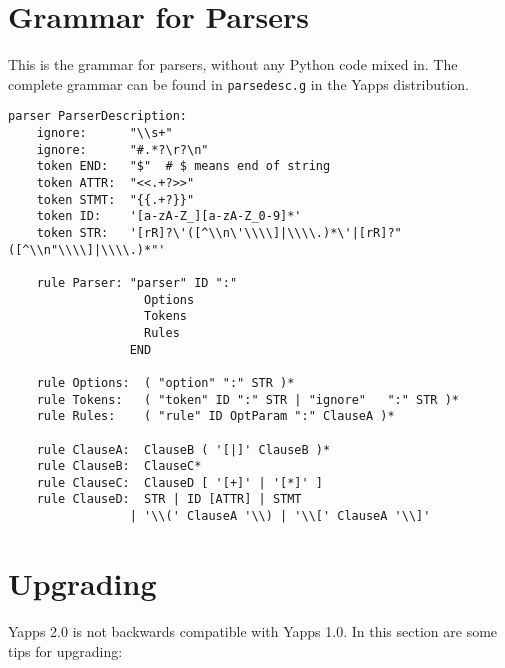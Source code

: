 \documentclass[10pt]{article}
\newcommand{\mysection}[1]{\section{#1}}
\begin{document}
\appendix

\mysection{Grammar for Parsers}

This is the grammar for parsers, without any Python code mixed in.
The complete grammar can be found in \texttt{parsedesc.g} in the Yapps
distribution.

\begin{verbatim}
parser ParserDescription:
    ignore:      "\\s+"
    ignore:      "#.*?\r?\n"
    token END:   "$"  # $ means end of string
    token ATTR:  "<<.+?>>"
    token STMT:  "{{.+?}}"
    token ID:    '[a-zA-Z_][a-zA-Z_0-9]*'
    token STR:   '[rR]?\'([^\\n\'\\\\]|\\\\.)*\'|[rR]?"([^\\n"\\\\]|\\\\.)*"'

    rule Parser: "parser" ID ":"
                   Options
                   Tokens
                   Rules
                 END 

    rule Options:  ( "option" ":" STR )*
    rule Tokens:   ( "token" ID ":" STR | "ignore"   ":" STR )*
    rule Rules:    ( "rule" ID OptParam ":" ClauseA )*

    rule ClauseA:  ClauseB ( '[|]' ClauseB )*
    rule ClauseB:  ClauseC*
    rule ClauseC:  ClauseD [ '[+]' | '[*]' ]
    rule ClauseD:  STR | ID [ATTR] | STMT
                 | '\\(' ClauseA '\\) | '\\[' ClauseA '\\]'
\end{verbatim}

\mysection{Upgrading}

Yapps 2.0 is not backwards compatible with Yapps 1.0.  In this section 
are some tips for upgrading:
\end{document}
